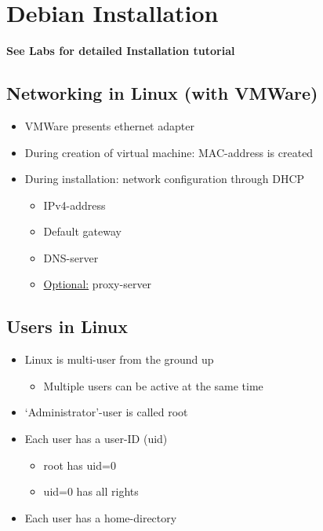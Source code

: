 \documentclass{article}
\begin{document}
\section{Debian Installation}

\textbf{See Labs for detailed Installation tutorial}

\subsection{Networking in Linux (with VMWare)}

\begin{itemize}
    \item VMWare presents ethernet adapter
    \item During creation of virtual machine: MAC-address is created
    \item During installation: network configuration through DHCP
    \begin{itemize}
        \item IPv4-address
        \item Default gateway
        \item DNS-server
        \item \underline{Optional:} proxy-server
    \end{itemize}
\end{itemize}

\subsection{Users in Linux}

\begin{itemize}
    \item Linux is multi-user from the ground up
    \begin{itemize}
        \item Multiple users can be active at the same time
    \end{itemize}
    \item `Administrator'-user is called root
    \item Each user has a user-ID (uid)
    \begin{itemize}
        \item root has uid=0
        \item uid=0 has all rights
    \end{itemize}
    \item Each user has a home-directory
\end{itemize}
\end{document}

